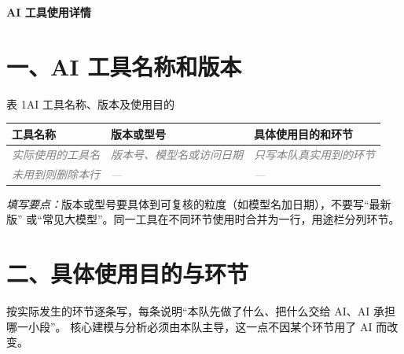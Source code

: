 \documentclass[UTF8,a4paper,12pt]{ctexart}
\newcommand{\Fill}[1]{\textcolor{gray}{\textit{#1}}}
\begin{document}
\begin{center}
  {\Large\bfseries AI 工具使用详情}
\end{center}

\vspace{0.6em}

\noindent{}

\section*{一、AI 工具名称和版本}

\begin{center}
  表 1\quad AI 工具名称、版本及使用目的
\end{center}

\noindent\begin{tabularx}{\linewidth}{p{3.2cm}p{3.4cm}Y}
  \toprule
  工具名称 & 版本或型号 & 具体使用目的和环节 \\
  \midrule
  \Fill{实际使用的工具名} & \Fill{版本号、模型名或访问日期} & \Fill{只写本队真实用到的环节} \\
  \Fill{未用到则删除本行} & \Fill{---} & \Fill{---} \\
  \bottomrule
\end{tabularx}

\vspace{0.4em}
\noindent\textit{填写要点：}版本或型号要具体到可复核的粒度（如模型名加日期），不要写“最新版”
或“常见大模型”。同一工具在不同环节使用时合并为一行，用途栏分列环节。

\section*{二、具体使用目的与环节}

按实际发生的环节逐条写，每条说明“本队先做了什么、把什么交给 AI、AI 承担哪一小段”。
核心建模与分析必须由本队主导，这一点不因某个环节用了 AI 而改变。
\end{document}
